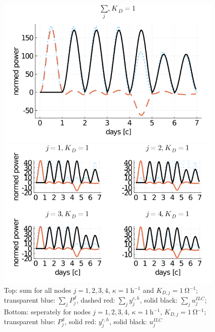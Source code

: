 \begin{figure}[h]
	\centering
	\includegraphics[scale=0.55]{pictures/plots/manual_calc_variation_kappa/kappa_1/K_1/DC_prosumer_demand_seconds_sum_hetero.png}
	
	\bigbreak
	\includegraphics[scale=0.55]{pictures/plots/manual_calc_variation_kappa/kappa_1/K_1/DC_prosumer_demand_seconds_nodes_hetero.png}
	
	
	
	\caption{Top: sum for all nodes $j = 1,2,3,4$, $\kappa = \SI{1}{\hour ^{-1}}$ and $K_{D,j} = \SI{1}{\ohm ^{-1}}$; transparent blue: $\sum_{j} P_j^d$, dashed red: $\sum_{j} y_j^{c,h}$, solid black: $\sum_{j}u_j^{ILC}$; Bottom: seperately for nodes $j = 1,2,3,4$, $\kappa = \SI{1}{\hour ^{-1}}$, $K_{D,j} = \SI{1}{\ohm ^{-1}}$; transparent blue: $P_j^d$, solid red: $y_j^{c,h}$, solid black: $u_j^{ILC}$}
	\label{fig:k1_K1}
\end{figure}

